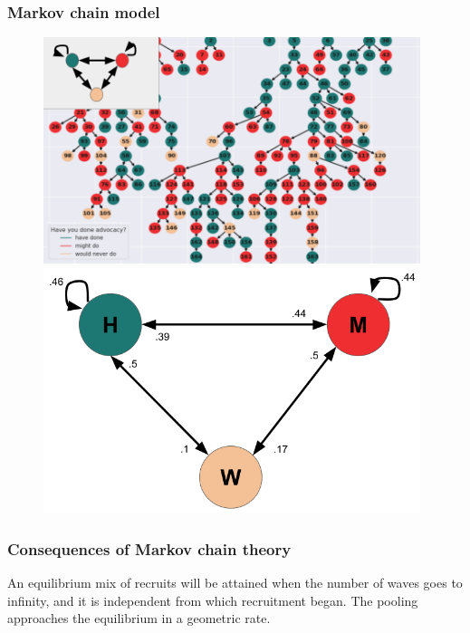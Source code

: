 \documentclass{beamer}
\begin{document}
\begin{frame}
  
  \frametitle{Markov chain model}

  \begin{figure}
    \begin{overprint}
    \includegraphics[width=0.98\textwidth]{../../images/rds-markov-harvard-1.png}
    \includegraphics[width=0.98\textwidth]{../../images/rds-markov-harvard-2.png}
    \end{overprint}
  \end{figure}  
  
\end{frame}

\begin{frame}
  \frametitle{Consequences of Markov chain theory}

  \begin{theorem}
    \justifying
    An equilibrium mix of recruits will be attained when the number of waves
    goes to infinity, and it is independent from which recruitment began. The
    pooling approaches the equilibrium in a geometric rate. 
  \end{theorem}

\end{frame}
\end{document}
